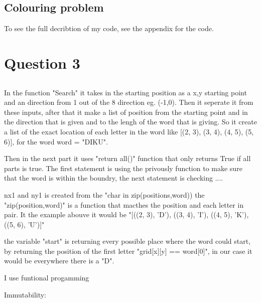 \documentclass{article}
\begin{document}
\subsection{Colouring problem}

To see the full decribtion of my code, see the appendix for the code.





\section{ Question 3}


\subsection{}

\subsection{}



In the function "Search" it takes in the starting position as a x,y starting point and an direction from 1 out of the 8 direction eg. (-1,0). Then it seperate it from these inputs, after that it make a list of position from the starting point and in the direction that is given and to the lengh of the word that is giving. So it create a list of the exact location of each letter in the word like [(2, 3), (3, 4), (4, 5), (5, 6)], for the word word = "DIKU".

Then in the next part it uses "return all()" function that only returns True if all parts is true. The first statement is using the privously function to make sure that the word is within the boundry, the next statement is checking ....

nx1 and ny1 is created from the "char in zip(positions,word)) the "zip(position,word)" is a function that macthes the position and each letter in pair. It the example abouve it would be "[((2, 3), 'D'), ((3, 4), 'I'), ((4, 5), 'K'), ((5, 6), 'U')]"


the variable "start" is returning every possible place where the word could start, by returning the position of the first letter "grid[x][y] == word[0]", in our case it would be everywhere there is a "D".



I use funtional progamming

Immutability:
\end{document}
